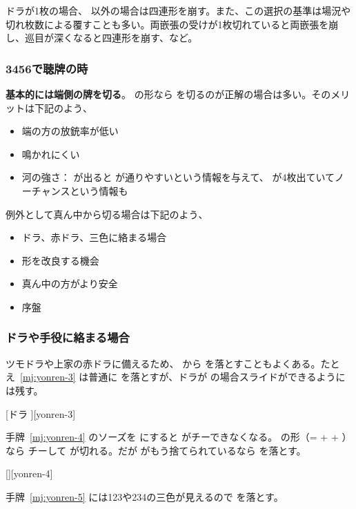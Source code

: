 \documentclass[../nankiru_main.tex]{subfiles}
\begin{document}
ドラが1枚の場合、 以外の場合は四連形を崩す。また、この選択の基準は場況や切れ枚数による覆すことも多い。両嵌張の受けが1枚切れていると両嵌張を崩し、巡目が深くなると四連形を崩す、など。


\subsubsection*{3456で聴牌の時}

\textbf{基本的には端側の牌を切る}\citep{yoteru-yonrenkei}。 の形なら  を切るのが正解の場合は多い。そのメリットは下記のよう、

\begin{itemize}
\item 端の方の放銃率が低い
\item 鳴かれにくい
\item 河の強さ： が出ると  が通りやすいという情報を与えて、 が4枚出ていてノーチャンスという情報も
\end{itemize}

例外として真ん中から切る場合は下記のよう、

\begin{itemize}
\item ドラ、赤ドラ、三色に絡まる場合
\item 形を改良する機会
\item 真ん中の方がより安全
\item 序盤
\end{itemize}


\subsubsection*{ドラや手役に絡まる場合}

ツモドラや上家の赤ドラに備えるため、 から  を落とすこともよくある。たとえ~\ref{mj:yonren-3} は普通に  を落とすが、ドラが  の場合スライドができるように  は残す。

[ドラ ][yonren-3]

手牌~\ref{mj:yonren-4} のソーズを  にすると  がチーできなくなる。 の形（=  +  + ）なら  チーして  が切れる。だが  がもう捨てられているなら  を落とす。

[][yonren-4]

手牌~\ref{mj:yonren-5} には123や234の三色が見えるので  を落とす。
\end{document}
